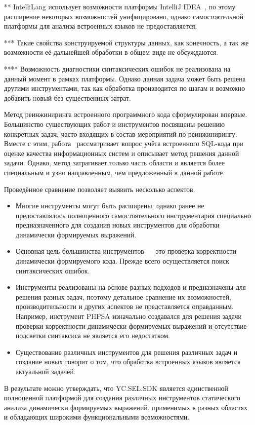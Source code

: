 \begin{table} [htbp]
\begin{threeparttable}
{\begin{tablenotes}
            \item[**] IntelliLang использует возможности платформы IntelliJ IDEA~\cite{IDEA}, по этому расширение некоторых возможностей унифицировано, однако самостоятельной платформы для анализа встроенных языков не предоставляется.
            \item[***] Такие свойства конструируемой структуры данных, как конечность, а так же возможности её дальнейшей обработки в общем виде не обсуждаются.
            \item[****] Возможность диагностики синтаксических ошибок не реализована на данный момент в рамках платформы. Однако данная задача может быть решена другими инструментами, так как обработка производится по шагам и возможно добавить новый без существенных затрат.
  \end{tablenotes}    }
  \end{threeparttable}
\end{table}

Метод реинжиниринга встроенного программного кода сформулирован впервые. Большинство существующих работ и инструментов посвящены решению конкретных задач, часто входящих в состав мероприятий по реинжинирингу. 
Вместе с этим, работа~\cite{DSQLQualityMesure} рассматривает вопрос учёта встроенного SQL-кода при оценке качества информационных систем и описывает метод решения данной задачи. Однако, метод
затрагивает только часть области и является более специальным и узно направленным, чем предложенный в данной работе. 

Проведённое сравнение позволяет выявить несколько аспектов.
\begin{itemize}
    \item Многие инструменты могут быть расширены, однако ранее не предоставлялось полноценного самостоятельного инструментария специально предназначенного для создания новых инструментов для обработки динамически формируемых выражений.
    \item Основная цель большинства инструментов --- это проверка корректности динамически формируемого кода. Прежде всего осуществляется поиск синтаксических ошибок.
    \item Инструменты реализованы на основе разных подходов и предназначены для решения разных задач, поэтому детальное сравнение их возможностей, производительности и других аспектов не представляется оправданным. Например, инструмент PHPSA изначально создавался для решения задачи проверки корректности динамически формируемых выражений и отсутствие подсветки синтаксиса не является его недостатком.
    \item Существование различных инструментов для решения различных задач и создание новых говорит о том, что обработка встроенных языков является актуальной задачей.
\end{itemize}

В результате можно утверждать, что YC.SEL.SDK является единственной полноценной платформой для создания различных инструментов статического анализа динамически формируемых выражений, применимых в разных областях и обладающих широкими функциональными возможностями.


